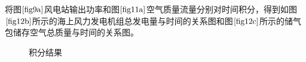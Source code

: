 \documentclass{jnuthesis}
\begin{document}
	\par 将图$ \fontsize{10.5bp}{10pt}\ref{fig9a} $风电站输出功率和图$ \fontsize{10.5bp}{10pt}\ref{fig11a} $空气质量流量分别对时间积分，得到如图$ \fontsize{10.5bp}{10pt}\ref{fig12b} $所示的海上风力发电机组总发电量与时间的关系图和图$ \fontsize{10.5bp}{10pt}\ref{fig12c} $所示的储气包储存空气总质量与时间的关系图。
	\begin{figure}[H]
		\caption{\fontsize{10.5bp}{10pt}积分结果} %
		\label{fig:13}  %
	\end{figure}
	
\end{document}
